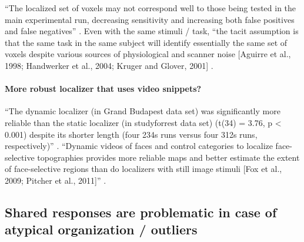 
%
``The localized set of voxels may not correspond well to those being tested in
the main experimental run, decreasing sensitivity and increasing both false
positives and false negatives'' \citep{duncan2009consistency}.
%
Even with the same stimuli / task, ``the tacit assumption is that the same task
in the same subject will identify essentially the same set of voxels despite
various sources of physiological and scanner noise [Aguirre et al., 1998;
Handwerker et al., 2004; Kruger and Glover, 2001] \citep{duncan2009consistency}.


\paragraph{More robust localizer that uses video snippets?}

``The dynamic localizer (in Grand Budapest data set) was significantly more
reliable than the static localizer (in studyforrest data set) (t(34) = 3.76, p <
0.001) despite its shorter length (four 234s runs versus four 312s runs,
respectively)'' \citep{jiahui2020predicting}.
%
``Dynamic videos of faces and control categories to localize face-selective
topographies provides more reliable maps and better estimate the extent of
face-selective regions than do localizers with still image stimuli [Fox et al.,
2009; Pitcher et al., 2011]'' \citep{jiahui2020predicting}.


\subsection{Shared responses are problematic in case of atypical organization /
outliers}







